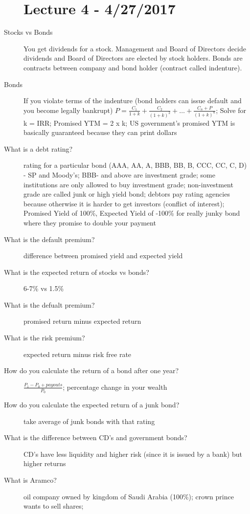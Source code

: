 \documentclass[11pt]{article}
\begin{document}
\begin{description}
\section{Lecture 4 - 4/27/2017}
\item[Stocks vs Bonds]
  You get dividends for a stock. Management and Board of Directors decide dividends and Board of Directors are elected by stock holders.
  Bonds are contracts between company and bond holder (contract called indenture).
\item[Bonds]
  If you violate terms of the indenture (bond holders can issue default and you become legally bankrupt)
  $P = \frac{C_1}{1 + k} + \frac{C_2}{(1 + k)^2} + \dots + \frac{C_n + P}{(1 + k)^n}$;
  Solve for k = IRR;
  Promised YTM = 2 x k;
  US government's promised YTM is basically guaranteed because they can print dollars
\item[What is a debt rating?]
  rating for a particular bond (AAA, AA, A, BBB, BB, B, CCC, CC, C, D) - SP and Moody's;
  BBB- and above are investment grade;
  some institutions are only allowed to buy investment grade;
  non-investment grade are called junk or high yield bond;
  debtors pay rating agencies because otherwise it is harder to get investors (conflict of interest);
  Promised Yield of 100\%, Expected Yield of -100\% for really junky bond where they promise to double your payment
\item[What is the default premium?]
  difference between promised yield and expected yield
\item[What is the expected return of stocks vs bonds?]
  6-7\% vs 1.5\%
\item[What is the defualt premium?]
  promised return minus expected return
\item[What is the risk premium?]
  expected return minus risk free rate
\item[How do you calculate the return of a bond after one year?]
  $\frac{P_1 - P_0 + payouts}{P_0}$;
  percentage change in your wealth
\item[How do you calculate the expected return of a junk bond?]
  take average of junk bonds with that rating
\item[What is the difference between CD's and government bonds?]
  CD's have less liquidity and higher risk (since it is issued by a bank) but higher returns
\item[What is Aramco?]
  oil company owned by kingdom of Saudi Arabia (100\%);
  crown prince wants to sell shares;

\end{description}
\end{document}
